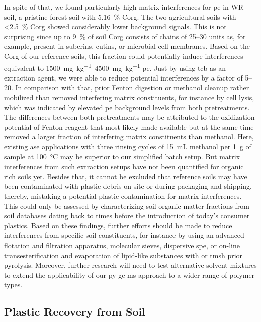 In spite of that, we found particularly high matrix interferences for \ac{pe} in WR soil, a pristine forest soil with \SI{5.16}{\percent} \ac{Corg}. The two agricultural soils with \SI{<2.5}{\percent} \ac{Corg} showed considerably lower background signals.
This is not surprising since up to \SI{9}{\percent} of soil \ac{Corg} consists of  chains of \numrange{25}{30} units \citep{HuPoly2000} as, for example, present in suberins, cutins, or microbial cell membranes. Based on the \ac{Corg} of our reference soils, this fraction could potentially induce interferences equivalent to \SIrange{1500}{4500}{\milli\gram\per\kilo\gram} \ac{pe}. Just by using \ac{tcb} as an extraction agent, we were able to reduce potential interferences by a factor of \numrange{5}{20}. In comparison with that, prior Fenton digestion or methanol cleanup rather mobilized than removed interfering matrix constituents, for instance by cell lysis, which was indicated by elevated \ac{pe} background levels from both pretreatments. The differences between both pretreatments may be attributed to the oxidization potential of Fenton reagent that most likely made available but at the same time removed a larger fraction of interfering matrix constituents than methanol.
Here, existing \ac{ase} applications with three rinsing cycles of \SI{15}{\milli\liter} methanol per \SI{1}{\gram} of sample at \SI{100}{\degreeCelsius} \citep{FullerProcedure2016,DierkesQuantification2019} may be superior to our simplified batch setup. But matrix interferences from such extraction setups have not been quantified for organic rich soils yet.
Besides that, it cannot be excluded that reference soils may have been contaminated with plastic debris on-site or during packaging and shipping, thereby, mistaking a potential plastic contamination for matrix interferences. This could only be assessed by characterizing soil organic matter fractions from soil databases dating back to times before the introduction of today's consumer plastics. Based on these findings, further efforts should be made to reduce interferences from specific soil constituents, for instance by using an advanced flotation and filtration apparatus, molecular sieves, dispersive \ac{spe}, or on-line transesterification and evaporation of lipid-like substances with  or \ac{tmsh} prior pyrolysis. Moreover, further research will need to test alternative solvent mixtures to extend the applicability of our \ac{py-gc-ms} approach to a wider range of polymer types.

\subsection{Plastic Recovery from Soil}


